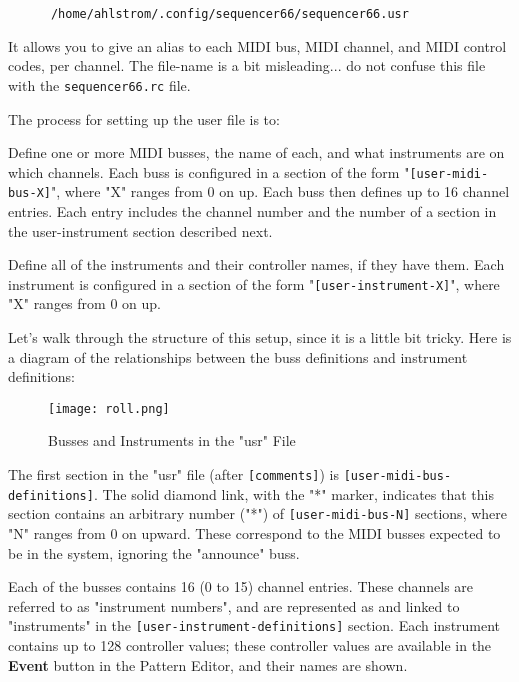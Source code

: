    \begin{verbatim}
      /home/ahlstrom/.config/sequencer66/sequencer66.usr
   \end{verbatim}

   It allows you to give an alias to 
   each MIDI bus, MIDI channel, and MIDI control 
   codes, per channel.
   The file-name is a bit misleading... do not confuse this file with the
   \texttt{sequencer66.rc} file.

   The process for setting up the user file is to:

   \begin{enumber}
      \item Define one or more MIDI busses, the name of each, and what
         instruments are on which channels.  Each buss is configured in a
         section of the form "\texttt{[user-midi-bus-X]}", where "X" ranges
         from 0 on up.  Each buss then defines up to 16 channel entries.
         Each entry includes the channel number and the number of a
         section in the user-instrument section described next.
      \item Define all of the instruments and their controller
         names, if they have them.  Each instrument is configured in a
         section of the form "\texttt{[user-instrument-X]}", where "X"
         ranges from 0 on up.
   \end{enumber}

   Let's walk through the structure of this setup, since it is a little bit
   tricky.  Here is a diagram of the relationships between the buss definitions
   and instrument definitions:

\begin{figure}[H]
   \centering 
   \texttt{[image: roll.png]}
   \caption{Busses and Instruments in the "usr" File}
   \label{fig:seq66_manual_user_busses_and_instruments}
\end{figure}

   The first section in the "usr" file (after \texttt{[comments]})
   is \texttt{[user-midi-bus-definitions]}.  The solid diamond link, with the
   "*" marker, indicates that this section contains an arbitrary number ("*")
   of \texttt{[user-midi-bus-N]} sections, where "N" ranges from 0 on upward.
   These correspond to the MIDI busses expected to be in the system, ignoring
   the "announce" buss.

   Each of the busses contains 16 (0 to 15) channel entries.
   These channels are referred to as "instrument numbers", and are
   represented as and linked to "instruments" in the
   \texttt{[user-instrument-definitions]} section.  Each instrument contains up
   to 128 controller values; these controller values are available in the
   \textbf{Event} button in the Pattern Editor, and their names are shown.

